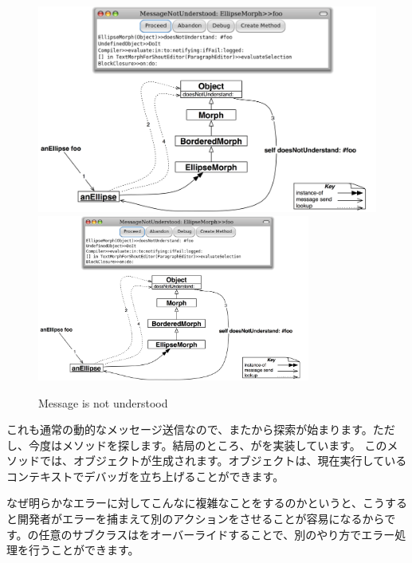 \documentclass[a4paper,10pt,twoside]{book}
\begin{document}
\begin{figure}[htb]
\begin{center}
\ifluluelse
	{\includegraphics[width=\textwidth]{fooNotFound}}
	{\includegraphics[width=0.8\textwidth]{fooNotFound}}
\caption{Message  is not understood}
\end{center}
\end{figure}

これも通常の動的なメッセージ送信なので、またから探索が始まります。ただし、今度はメソッドを探します。結局のところ、がを実装しています。
このメソッドでは、オブジェクトが生成されます。オブジェクトは、現在実行しているコンテキストでデバッガを立ち上げることができます。

なぜ明らかなエラーに対してこんなに複雑なことをするのかというと、こうすると開発者がエラーを捕まえて別のアクションをさせることが容易になるからです。の任意のサブクラスはをオーバーライドすることで、別のやり方でエラー処理を行うことができます。
\end{document}
